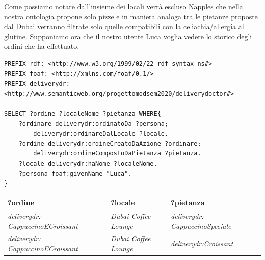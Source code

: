 \documentclass[12pt]{article}
\begin{document}
\newline
\newline
Come possiamo notare dall'insieme dei locali verrà escluso Napples che nella nostra ontologia propone solo pizze e in maniera analoga tra le pietanze proposte dal Dubai verranno filtrate solo quelle compatibili con la celiachia/allergia al glutine.
\newline
Supponiamo ora che il nostro utente Luca voglia vedere lo storico degli ordini che ha effettuato.
\begin{lstlisting}[language=SPARQL]
PREFIX rdf: <http://www.w3.org/1999/02/22-rdf-syntax-ns#>
PREFIX foaf: <http://xmlns.com/foaf/0.1/>
PREFIX deliverydr:
<http://www.semanticweb.org/progettomodsem2020/deliverydoctor#>

SELECT ?ordine ?localeNome ?pietanza WHERE{
    ?ordinare deliverydr:ordinatoDa ?persona;
        deliverydr:ordinareDalLocale ?locale.
    ?ordine deliverydr:ordineCreatoDaAzione ?ordinare;
        deliverydr:ordineCompostoDaPietanza ?pietanza.
    ?locale deliverydr:haNome ?localeNome.
    ?persona foaf:givenName "Luca".
}
\end{lstlisting}
\begin{tabularx}{\textwidth} { 
  | >{\centering\arraybackslash}X 
  | >{\centering\arraybackslash}X
  | >{\centering\arraybackslash}X |}
 \hline
 \textbf{?ordine} & \textbf{?locale} & \textbf{?pietanza} \\
 \hline
 \textit{deliverydr: CappuccinoECroissant} & \textit{Dubai Coffee Lounge} & \textit{deliverydr: CappuccinoSpeciale}  \\
 \hline
 \textit{deliverydr: CappuccinoECroissant} & \textit{Dubai Coffee Lounge} & \textit{deliverydr:Croissant}\\
\hline
\end{tabularx}
\end{document}
